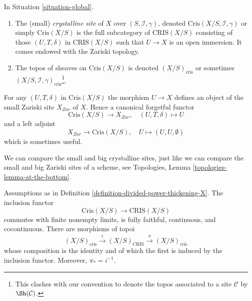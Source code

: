 \begin{definition}
\label{definition-crystalline-site}
In Situation \ref{situation-global}.
\begin{enumerate}
\item The (small) {\it crystalline site} of $X$ over
$(S, \mathcal{I}, \gamma)$, denoted $\text{Cris}(X/S, \mathcal{I}, \gamma)$
or simply $\text{Cris}(X/S)$ is the full subcategory of $\text{CRIS}(X/S)$
consisting of those $(U, T, \delta)$ in $\text{CRIS}(X/S)$ such that
$U \to X$ is an open immersion. It comes endowed with the Zariski topology.
\item The topos of sheaves on $\text{Cris}(X/S)$ is denoted
$(X/S)_{\text{cris}}$ or sometimes
$(X/S, \mathcal{I}, \gamma)_{\text{cris}}$\footnote{This clashes with
our convention to denote the topos associated to a site $\mathcal{C}$
by $\Sh(\mathcal{C})$.}.
\end{enumerate}
\end{definition}

\noindent
For any $(U, T, \delta)$ in $\text{Cris}(X/S)$ the morphism $U \to X$
defines an object of the small Zariski site $X_{Zar}$ of $X$. Hence
a canonical forgetful functor
\begin{equation}
\label{equation-forget-small}
\text{Cris}(X/S) \longrightarrow X_{Zar},\quad
(U, T, \delta) \longmapsto U
\end{equation}
and a left adjoint
\begin{equation}
\label{equation-endow-trivial-small}
X_{Zar} \longrightarrow \text{Cris}(X/S),\quad
U \longmapsto (U, U, \emptyset)
\end{equation}
which is sometimes useful.

\medskip\noindent
We can compare the small and big crystalline sites, just like
we can compare the small and big Zariski sites of a scheme, see
Topologies, Lemma \ref{topologies-lemma-at-the-bottom}.

\begin{lemma}
\label{lemma-compare-big-small}
Assumptions as in Definition \ref{definition-divided-power-thickening-X}.
The inclusion functor
$$
\text{Cris}(X/S) \to \text{CRIS}(X/S)
$$
commutes with finite nonempty limits, is fully faithful, continuous,
and cocontinuous. There are morphisms of topoi
$$
(X/S)_{\text{cris}} \xrightarrow{i} (X/S)_{\text{CRIS}}
\xrightarrow{\pi} (X/S)_{\text{cris}}
$$
whose composition is the identity and of which the first is induced
by the inclusion functor. Moreover, $\pi_* = i^{-1}$.
\end{lemma}

